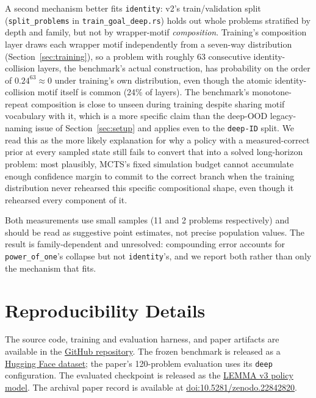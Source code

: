 \documentclass[11pt]{article}
\numberwithin{equation}{section}
\begin{document}
A second mechanism better fits \texttt{identity}: v2's train/validation split (\texttt{split\_problems} in \texttt{train\_goal\_deep.rs}) holds out whole problems stratified by depth and family, but not by wrapper-motif \emph{composition}. Training's composition layer draws each wrapper motif independently from a seven-way distribution (Section~\ref{sec:training}), so a problem with roughly 63 consecutive identity-collision layers, the benchmark's actual construction, has probability on the order of $0.24^{63} \approx 0$ under training's own distribution, even though the atomic identity-collision motif itself is common (24\% of layers). The benchmark's monotone-repeat composition is close to unseen during training despite sharing motif vocabulary with it, which is a more specific claim than the deep-OOD legacy-naming issue of Section~\ref{sec:setup} and applies even to the \texttt{deep-ID} split. We read this as the more likely explanation for why a policy with a measured-correct prior at every sampled state still fails to convert that into a solved long-horizon problem: most plausibly, MCTS's fixed simulation budget cannot accumulate enough confidence margin to commit to the correct branch when the training distribution never rehearsed this specific compositional shape, even though it rehearsed every component of it.

Both measurements use small samples (11 and 2 problems respectively) and should be read as suggestive point estimates, not precise population values. The result is family-dependent and unresolved: compounding error accounts for \texttt{power\_of\_one}'s collapse but not \texttt{identity}'s, and we report both rather than only the mechanism that fits.

\section{Reproducibility Details}
\label{sec:repro}

The source code, training and evaluation harness, and paper artifacts are available in the \href{https://github.com/blackdromeai-labs/LEMMA}{GitHub repository}. The frozen benchmark is released as a \href{https://huggingface.co/datasets/BlackdromeAILabs/lemma-long-horizon-rewrite-benchmark}{Hugging Face dataset}; the paper's 120-problem evaluation uses its \texttt{deep} configuration. The evaluated checkpoint is released as the \href{https://huggingface.co/BlackdromeAILabs/lemma-v3-policy}{LEMMA v3 policy model}. The archival paper record is available at \href{https://doi.org/10.5281/zenodo.22842820}{doi:10.5281/zenodo.22842820}.
\end{document}

